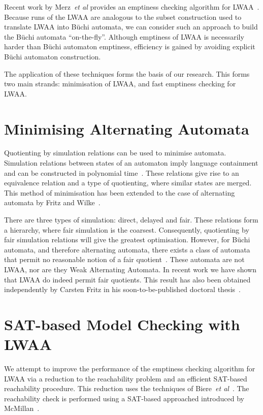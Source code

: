 \documentclass{article}
\begin{document}
Recent work by Merz~\textit{et al} provides an emptiness checking
algorithm for LWAA~\cite{MHK05}.  Because runs of the LWAA are
analogous to the subset construction used to translate LWAA into
B\"uchi automata, we can consider such an approach to build the
B\"uchi automata ``on-the-fly''.  Although emptiness of LWAA is
necessarily harder than B\"uchi automaton emptiness, efficiency is
gained by avoiding explicit B\"uchi automaton construction.

The application of these techniques forms the basis of our
research. This forms two main strands: minimisation of LWAA, and fast
emptiness checking for LWAA.  

\section*{Minimising Alternating Automata}

Quotienting by simulation relations can  be used to minimise automata.
Simulation relations between  states  of an automaton   imply language
containment and  can be  constructed in polynomial  time~\cite{EWS01}.
These relations give  rise to an equivalence  relation  and a type  of
quotienting,   where   similar states  are  merged.     This method of
minimisation has been extended to the case of alternating automata by
Fritz and Wilke~\cite{FW05}.

There are three types of simulation: direct, delayed and fair.  These
relations form a hierarchy, where fair simulation is the coarsest.
Consequently, quotienting by fair simulation relations will give the
greatest optimisation.  However, for B\"uchi automata, and therefore
alternating automata, there exists a class of automata that permit no
reasonable notion of a fair quotient~\cite{EWS01}.  These automata are
not LWAA, nor are they Weak Alternating Automata.  In recent work we
have shown that LWAA do indeed permit fair quotients.  This result has
also been obtained independently by Carsten Fritz in his
soon-to-be-published doctoral thesis~\cite{F06}.  

\section*{SAT-based Model Checking with LWAA}

We attempt to improve the performance of the emptiness checking
algorithm for LWAA via a reduction to the reachability problem and an efficient
SAT-based reachability procedure.  This
reduction uses the techniques of Biere~\textit{et al}~\cite{BAS02}.
The reachability check is performed using a SAT-based approached
introduced by McMillan~\cite{McM03}.  
\end{document}
